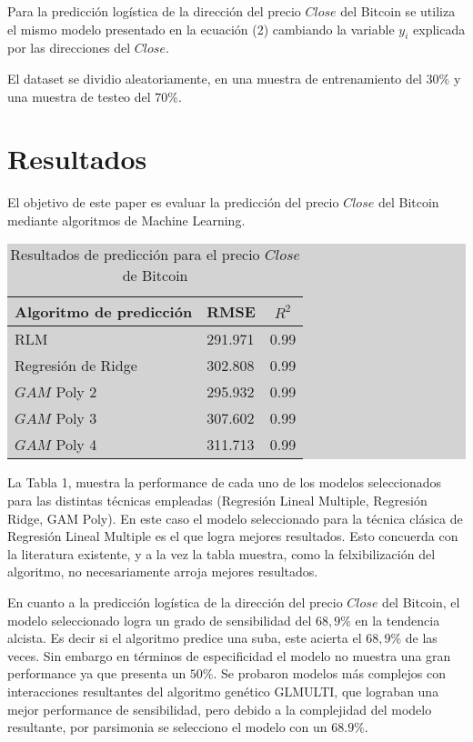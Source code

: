 \documentclass[a4paper,12pt,twocolumn]{article}
\begin{document}
Para la predicción logística de la dirección del precio $Close$ del Bitcoin se utiliza el mismo modelo presentado en la ecuación (2) cambiando la variable $y_i$ explicada por
las direcciones del $Close$.

El dataset se dividio aleatoriamente, en una muestra de entrenamiento del $30\%$ y una muestra de testeo del $70\%$.

\section{Resultados}

El objetivo de este paper es evaluar la predicción del precio  $Close$ del Bitcoin mediante algoritmos de Machine Learning. 

\begin{table}[!hbt]
\centering
\caption{Resultados de predicción para el precio $Close$ de Bitcoin }

\begingroup\setlength{\fboxsep}{0pt}
\colorbox{lightgray}{%
\begin{tabular}{|l|l|c|}
\hline Algoritmo de predicción & RMSE & $R^2$ \\
\hline RLM & 291.971 & 0.99\\
\hline Regresión de Ridge & 302.808 & 0.99 \\
\hline $GAM$ Poly 2   & 295.932 & 0.99 \\
\hline $GAM$ Poly 3   & 307.602 & 0.99 \\
\hline $GAM$ Poly 4   & 311.713 & 0.99 \\
\hline
\end{tabular}%
}\endgroup
\end{table}

La Tabla 1, muestra la performance de cada uno de los modelos seleccionados para las distintas técnicas empleadas (Regresión Lineal Multiple, Regresión Ridge, GAM Poly). En este caso el modelo seleccionado para la técnica clásica de Regresión Lineal Multiple es el que logra mejores resultados. Esto concuerda con la literatura existente, y a la vez la tabla muestra, como la felxibilización del algoritmo, no necesariamente arroja mejores resultados. 


En cuanto a la predicción logística de la dirección del precio $Close$ del Bitcoin, el modelo seleccionado  logra un  grado de sensibilidad del $68,9\%$ en la tendencia alcista. Es decir si el algoritmo predice una suba, este acierta el $68,9\%$ de las veces. Sin embargo en términos de especificidad el modelo no muestra una gran performance ya que presenta un $50\%$. Se probaron modelos más complejos con interacciones resultantes del algoritmo genético GLMULTI, que lograban una mejor performance de sensibilidad, pero debido a la complejidad del modelo resultante, por parsimonia se selecciono el modelo con un $68.9\%$.
\end{document}
